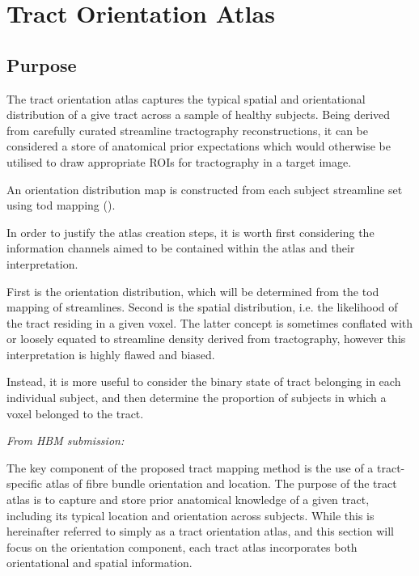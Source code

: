 \chapter{Tract Orientation Atlas}
\label{chapterlabel2}


\section{Purpose}


The tract orientation atlas captures the typical spatial and orientational distribution of a give tract across a sample of healthy subjects. Being derived from carefully curated streamline tractography reconstructions, it can be considered a store of anatomical prior expectations which would otherwise be utilised to draw appropriate ROIs for tractography in a target image.


An orientation distribution map is constructed from each subject streamline set using \gls{tod} mapping ().\autocite{Dhollander2014}

In order to justify the atlas creation steps, it is worth first considering the information channels aimed to be contained within the atlas and their interpretation.

First is the orientation distribution, which will be determined from the \gls{tod} mapping of streamlines.
Second is the spatial distribution, i.e. the likelihood of the tract residing in a given voxel.
The latter concept is sometimes conflated with or loosely equated to streamline density derived from tractography, however this interpretation is highly flawed and biased.

Instead, it is more useful to consider the binary state of tract belonging in each individual subject, and then determine the proportion of subjects in which a voxel belonged to the tract.

\textit{From HBM submission:}

The key component of the proposed tract mapping method is the use of a tract-specific atlas of fibre bundle orientation and location. The purpose of the tract atlas is to capture and store prior anatomical knowledge of a given tract, including its typical location and orientation across subjects.
While this is hereinafter referred to simply as a tract orientation atlas, and this section will focus on the orientation component, each tract atlas incorporates both orientational and spatial information.

